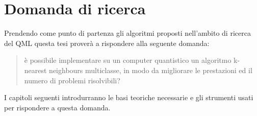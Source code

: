 \section{Domanda di ricerca}

Prendendo come punto di partenza gli algoritmi proposti nell'ambito di ricerca del \ac{QML} 
questa tesi proverà a rispondere alla seguente domanda:
\begin{quote}
    è possibile implementare su un computer quantistico un algoritmo k-nearest neighbours 
    multiclasse, in modo da migliorare le prestazioni ed il numero di problemi risolvibili?
\end{quote}
I capitoli seguenti introdurranno le basi teoriche necessarie e gli strumenti usati 
per rispondere a questa domanda. 

